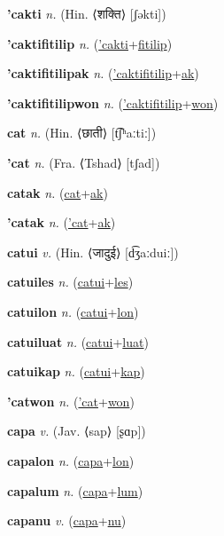 \textbf{\hypertarget{'cakti}{'cakti}} \textit{n.} (Hin. ⟨{\devanagari{}शक्ति}⟩ [ʃəkti])


\textbf{\hypertarget{'caktifitilip}{'caktifitilip}} \textit{n.} (\hyperlink{'cakti}{'cakti}+\allowbreak \hyperlink{fitilip}{fitilip})


\textbf{\hypertarget{'caktifitilipak}{'caktifitilipak}} \textit{n.} (\hyperlink{'caktifitilip}{'caktifitilip}+\allowbreak \hyperlink{ak}{ak})


\textbf{\hypertarget{'caktifitilipwon}{'caktifitilipwon}} \textit{n.} (\hyperlink{'caktifitilip}{'caktifitilip}+\allowbreak \hyperlink{won}{won})


\textbf{\hypertarget{cat}{cat}} \textit{n.} (Hin. ⟨{\devanagari{}छाती}⟩ [t͡ʃʰaːtiː])


\textbf{\hypertarget{'cat}{'cat}} \textit{n.} (Fra. ⟨Tshad⟩ [tʃad])


\textbf{\hypertarget{catak}{catak}} \textit{n.} (\hyperlink{cat}{cat}+\allowbreak \hyperlink{ak}{ak})


\textbf{\hypertarget{'catak}{'catak}} \textit{n.} (\hyperlink{'cat}{'cat}+\allowbreak \hyperlink{ak}{ak})


\textbf{\hypertarget{catui}{catui}} \textit{v.} (Hin. ⟨{\devanagari{}जादुई}⟩ [d͡ʒaːduiː])


\textbf{\hypertarget{catuiles}{catuiles}} \textit{n.} (\hyperlink{catui}{catui}+\allowbreak \hyperlink{les}{les})


\textbf{\hypertarget{catuilon}{catuilon}} \textit{n.} (\hyperlink{catui}{catui}+\allowbreak \hyperlink{lon}{lon})


\textbf{\hypertarget{catuiluat}{catuiluat}} \textit{n.} (\hyperlink{catui}{catui}+\allowbreak \hyperlink{luat}{luat})


\textbf{\hypertarget{catuikap}{catuikap}} \textit{n.} (\hyperlink{catui}{catui}+\allowbreak \hyperlink{kap}{kap})


\textbf{\hypertarget{'catwon}{'catwon}} \textit{n.} (\hyperlink{'cat}{'cat}+\allowbreak \hyperlink{won}{won})


\textbf{\hypertarget{capa}{capa}} \textit{v.} (Jav. ⟨sap⟩ [ʂɑp])


\textbf{\hypertarget{capalon}{capalon}} \textit{n.} (\hyperlink{capa}{capa}+\allowbreak \hyperlink{lon}{lon})


\textbf{\hypertarget{capalum}{capalum}} \textit{n.} (\hyperlink{capa}{capa}+\allowbreak \hyperlink{lum}{lum})


\textbf{\hypertarget{capanu}{capanu}} \textit{v.} (\hyperlink{capa}{capa}+\allowbreak \hyperlink{nu}{nu})


